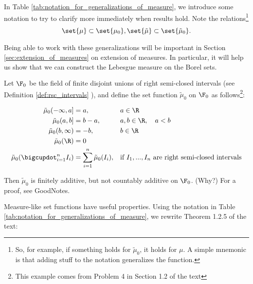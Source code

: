 \documentclass{article} %
\newcommand{\fasf}{\tilde{\mu}_0}
\begin{document}
In Table \ref{tab:notation_for_generalizations_of_measure},  we introduce some notation to try to clarify more immediately when results hold. Note the relations\footnote{So, for example, if something holds for $\tilde{\mu}_0$, it holds for $\mu$.  A simple mnemonic is that adding stuff to the notation generalizes the function.}  
\[ \set{\mu} \subset \set{\mu_0}, \set{\tilde{\mu}} \subset \set{\tilde{\mu}_0}. \]

\begin{remark}
Being able to work with these generalizations will be important in Section \ref{sec:extension_of_measures} on extension of measures.  In particular, it will help us show that we can construct the Lebesgue measure on the Borel sets.
\end{remark}

 \begin{example} Let $\F_0$ be the field of finite disjoint unions of right semi-closed intervals (see Definition \ref{def:rsc_intervals} ), and define the set function $\fasf$ on $\F_0$ as follows\footnote{This example comes from Problem 4 in Section 1.2 of the text}:

\begin{align*}
\fasf(-\infty,a] &=a, && a \in \R  \\
\fasf(a,b] &= b-a, && a,b \in \R, \quad a<b  \\
\fasf(b, \infty) &= -b, && b \in \R \\
\fasf(\R) &=0 &&\\
\fasf(\bigcupdot_{i=1}^n I_i) &= \sum_{i=1}^n \fasf(I_i), && \text{if $I_1, ..., I_n$ are right semi-closed intervals} 
\end{align*}
	
Then $\fasf$ is finitely additive, but not countably additive on $\F_0$.  (Why?) For a proof, see GoodNotes.
 \end{example}

 
Measure-like set functions have useful properties. Using the notation in Table \ref{tab:notation_for_generalizations_of_measure}, we rewrite Theorem 1.2.5 of the text:
 
\end{document}

